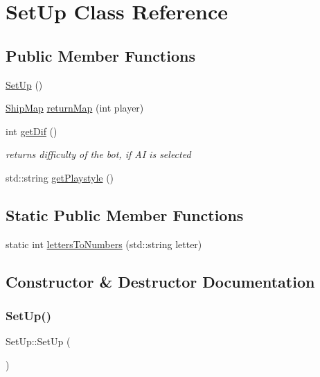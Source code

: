 \hypertarget{classSetUp}{}\section{Set\+Up Class Reference}
\label{classSetUp}
\subsection*{Public Member Functions}
\begin{DoxyCompactItemize}
\item 
\hyperlink{classSetUp_a3e6bcef0f800ce09183e82033de9d40b}{Set\+Up} ()
\item 
\hyperlink{classShipMap}{Ship\+Map} \hyperlink{classSetUp_af5bb381f047ec77aba1b3cb51c403244}{return\+Map} (int player)
\item 
\mbox{\label{classSetUp_a20678055edae484f1e3652f60f5d6e3c}} 
int \hyperlink{classSetUp_a20678055edae484f1e3652f60f5d6e3c}{get\+Dif} ()
\begin{DoxyCompactList}\small\item\em returns difficulty of the bot, if AI is selected \end{DoxyCompactList}\item 
std\+::string \hyperlink{classSetUp_ac97974e28cc81cbc42d8b2f91df87c37}{get\+Playstyle} ()
\end{DoxyCompactItemize}
\subsection*{Static Public Member Functions}
\begin{DoxyCompactItemize}
\item 
static int \hyperlink{classSetUp_a8f7d45dcde5df9f7f421a1193f3a9836}{letters\+To\+Numbers} (std\+::string letter)
\end{DoxyCompactItemize}


\subsection{Constructor \& Destructor Documentation}
\mbox{\label{classSetUp_a3e6bcef0f800ce09183e82033de9d40b}} 
\subsubsection{\texorpdfstring{Set\+Up()}{SetUp()}}
{\footnotesize\ttfamily Set\+Up\+::\+Set\+Up (\begin{DoxyParamCaption}{ }\end{DoxyParamCaption})}

